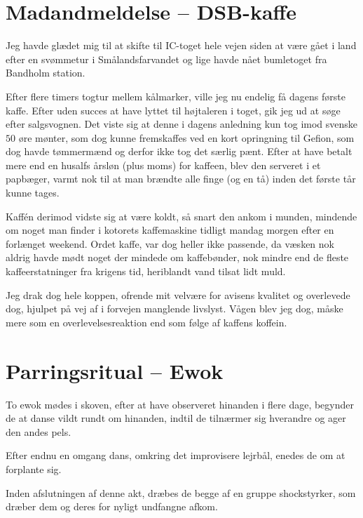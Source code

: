 \begin{minipage}[t]{100mm}
\vspace{3mm}
\section*{Madandmeldelse -- DSB-kaffe}
\vspace{2mm}

Jeg havde glædet mig til at skifte til IC-toget hele vejen siden at være gået i land efter en svømmetur i Smålandsfarvandet og lige havde nået bumletoget fra Bandholm station.

Efter flere timers togtur mellem kålmarker, ville jeg nu endelig få dagens første kaffe. Efter uden succes at have lyttet til højtaleren i toget, gik jeg ud at søge efter salgsvognen. Det viste sig at denne i dagens anledning kun tog imod svenske $50$ øre mønter, som dog kunne fremskaffes ved en kort opringning til Gefion, som dog havde tømmermænd og derfor ikke tog det særlig pænt. Efter at have betalt mere end en husalfs årsløn (plus moms) for kaffeen, blev den serveret i et papbæger, varmt nok til at man brændte alle finge (og en tå) inden det første tår kunne tages. 

Kaffén derimod vidste sig at være koldt, så snart den ankom i munden, mindende om noget man finder i kotorets kaffemaskine tidligt mandag morgen efter en forlænget weekend. Ordet kaffe, var dog heller ikke passende, da væsken nok aldrig havde mødt noget der mindede om kaffebønder, nok mindre end de fleste kaffeerstatninger fra krigens tid, heriblandt vand tilsat lidt muld. 

Jeg drak dog hele koppen, ofrende mit velvære for avisens kvalitet og overlevede dog, hjulpet på vej af i forvejen manglende livslyst. Vågen blev jeg dog, måske mere som en overlevelsesreaktion end som følge af kaffens koffein.

\section*{Parringsritual -- Ewok}
To ewok mødes i skoven, efter at have observeret hinanden i flere dage, begynder de at danse vildt rundt om hinanden, indtil de tilnærmer sig hverandre og ager den andes pels. 

Efter endnu en omgang dans, omkring det improvisere lejrbål, enedes de om at forplante sig. 

Inden afslutningen af denne akt, dræbes de begge af en gruppe shockstyrker, som dræber dem og deres for nyligt undfangne afkom.


\end{minipage}
